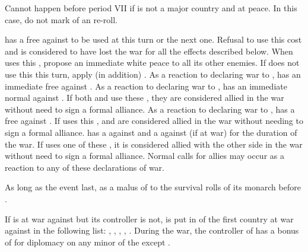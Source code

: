 

\condition{}
\aparag Cannot happen before period VII if \PRU is not a major country and at
peace.
\bparag In this case, do not mark of an re-roll.

\phevnt
\aparag \PRU has a free \CB against \paysSaxe to be used at this turn or the
next one.
\bparag Refusal to use this \CB cost  \STAB and \PRU is considered to
have lost the war for all the effects described below.
\bparag When \PRU uses this \CB, \paysSaxe propose an immediate white peace to
all its other enemies.
\bparag If \PRU does not use this \CB this turn, apply (in addition)
.
\aparag As a reaction to \PRU declaring war to \paysSaxe, \AUS has an
immediate free \CB against \PRU.
\aparag As a reaction to \PRU declaring war to \paysSaxe, \FRA has an
immediate normal \CB against \PRU.
\bparag If both \FRA and \AUS use these \CB, they are considered allied in the
war without need to sign a formal alliance.
\aparag As a reaction to \FRA declaring war to \PRU, \ENG has a free \CB
against \FRA.
\bparag If \ENG uses this \CB, \ENG and \PRU are considered allied in the war
without needing to sign a formal alliance.
\aparag \RUS has a \CB against \PRU and a \CB against \AUS (if at war) for the
duration of the war.
\bparag If \RUS uses one of these \CB, it is considered allied with the other
side in the war without need to sign a formal alliance.
\aparag Normal calls for allies may occur as a reaction to any of these
declarations of war.

\aparag As long as the event last, \RUS as a malus of  to the
survival rolls of its monarch before .

\phdipl
\aparag If \paysSaxe is at war against \PRU but its controller is not,
\paysSaxe is put in \EG of the first country at war against \PRU in the
following list: \AUS, \ENG, \SUE, \FRA, \RUS.
\bparag During the war, the controller of \paysSaxe has a bonus of 
for diplomacy on any minor of the \HRE except \paysbaviere.

